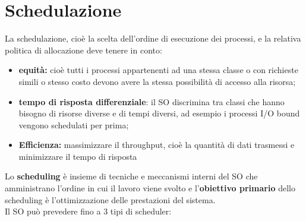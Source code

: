 \documentclass[12pt, letterpaper]{report}
\begin{document}
	\section{Schedulazione}
	La schedulazione, cioè la scelta dell'ordine di esecuzione dei processi, e la relativa politica di allocazione deve tenere in conto:
	\begin{itemize}
		\item \textbf{equità:} cioè tutti i processi appartenenti ad una stessa classe o con richieste simili o stesso costo devono avere la stessa possibilità di accesso alla risorsa;
		\item \textbf{tempo di risposta differenziale}: il SO discrimina tra classi che hanno bisogno di risorse diverse e di tempi diversi, ad esempio i processi I/O bound vengono schedulati per prima;
		\item \textbf{Efficienza:} massimizzare il throughput, cioè la quantità di dati trasmessi e minimizzare il tempo di risposta
	\end{itemize}
	Lo \textbf{scheduling} è insieme di tecniche e meccanismi interni del SO che amministrano l'ordine in cui il lavoro viene svolto e l'\textbf{obiettivo primario} dello scheduling è l'ottimizzazione delle prestazioni del sistema. \\
	Il SO può prevedere fino a 3 tipi di scheduler:
\end{document}
